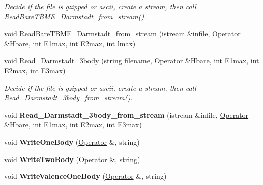 \begin{DoxyCompactItemize}
\begin{DoxyCompactList}\small\item\em Decide if the file is gzipped or ascii, create a stream, then call \hyperlink{classReadWrite_abbb3ca736743150f3c03f73905e7c5af}{Read\-Bare\-T\-B\-M\-E\-\_\-\-Darmstadt\-\_\-from\-\_\-stream()}. \end{DoxyCompactList}\item 
void \hyperlink{classReadWrite_abbb3ca736743150f3c03f73905e7c5af}{Read\-Bare\-T\-B\-M\-E\-\_\-\-Darmstadt\-\_\-from\-\_\-stream} (istream \&infile, \hyperlink{classOperator}{Operator} \&Hbare, int E1max, int E2max, int lmax)
\item 
\hypertarget{classReadWrite_a84c0cbaf2be415eadffb560ea0bb9785}{void \hyperlink{classReadWrite_a84c0cbaf2be415eadffb560ea0bb9785}{Read\-\_\-\-Darmstadt\-\_\-3body} (string filename, \hyperlink{classOperator}{Operator} \&Hbare, int E1max, int E2max, int E3max)}\label{classReadWrite_a84c0cbaf2be415eadffb560ea0bb9785}

\begin{DoxyCompactList}\small\item\em Decide if the file is gzipped or ascii, create a stream, then call Read\-\_\-\-Darmstadt\-\_\-3body\-\_\-from\-\_\-stream(). \end{DoxyCompactList}\item 
\hypertarget{classReadWrite_a3c3b5a1a95f9ada71c259fb4d875af4d}{void {\bfseries Read\-\_\-\-Darmstadt\-\_\-3body\-\_\-from\-\_\-stream} (istream \&infile, \hyperlink{classOperator}{Operator} \&Hbare, int E1max, int E2max, int E3max)}\label{classReadWrite_a3c3b5a1a95f9ada71c259fb4d875af4d}

\item 
\hypertarget{classReadWrite_a257e2a926e252a2952b330b3655ddd3d}{void {\bfseries Write\-One\-Body} (\hyperlink{classOperator}{Operator} \&, string)}\label{classReadWrite_a257e2a926e252a2952b330b3655ddd3d}

\item 
\hypertarget{classReadWrite_a7bae483d2d587b66b3bf5ed734139cde}{void {\bfseries Write\-Two\-Body} (\hyperlink{classOperator}{Operator} \&, string)}\label{classReadWrite_a7bae483d2d587b66b3bf5ed734139cde}

\item 
\hypertarget{classReadWrite_a75dd4196074d74e1e7ea0e0b10aafc85}{void {\bfseries Write\-Valence\-One\-Body} (\hyperlink{classOperator}{Operator} \&, string)}\label{classReadWrite_a75dd4196074d74e1e7ea0e0b10aafc85}


\end{DoxyCompactItemize}
